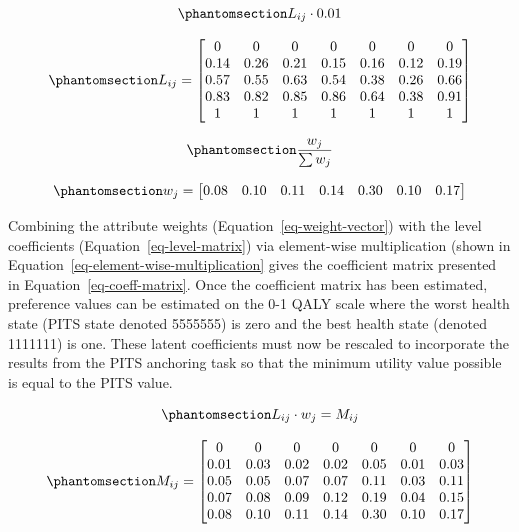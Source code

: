 \documentclass[
  letterpaper,
  DIV=11,
  numbers=noendperiod]{scrartcl}
\begin{document}
\begin{equation}\phantomsection\label{eq-level-rescale}{
    L_{ij} \cdot 0.01
}\end{equation}

\begin{equation}\phantomsection\label{eq-level-matrix}{
L_{ij} = 
\begin{bmatrix}
0 & 0 & 0 & 0 & 0 & 0 & 0 \\
0.14 & 0.26 & 0.21 & 0.15 & 0.16 & 0.12 & 0.19 \\
0.57 & 0.55 & 0.63 & 0.54 & 0.38 & 0.26 & 0.66 \\
0.83 & 0.82 & 0.85 & 0.86 & 0.64 & 0.38 & 0.91 \\
1 & 1 & 1 & 1 & 1 & 1 & 1 \\
\end{bmatrix}
}\end{equation}

\begin{equation}\phantomsection\label{eq-weight-normalise}{
    \frac{w_{j}}{\sum{w_j}}
}\end{equation}

\begin{equation}\phantomsection\label{eq-weight-vector}{
w_j = \begin{bmatrix}
    0.08& 0.10& 0.11& 0.14& 0.30& 0.10& 0.17
\end{bmatrix} 
}\end{equation}

Combining the attribute weights (Equation~\ref{eq-weight-vector}) with
the level coefficients (Equation~\ref{eq-level-matrix}) via element-wise
multiplication (shown in Equation~\ref{eq-element-wise-multiplication}
gives the coefficient matrix presented in
Equation~\ref{eq-coeff-matrix}. Once the coefficient matrix has been
estimated, preference values can be estimated on the 0-1 QALY scale
where the worst health state (PITS state denoted 5555555) is zero and
the best health state (denoted 1111111) is one. These latent
coefficients must now be rescaled to incorporate the results from the
PITS anchoring task so that the minimum utility value possible is equal
to the PITS value.

\begin{equation}\phantomsection\label{eq-element-wise-multiplication}{
    L_{ij} \cdot  w_{j} = {M}_{ij}
}\end{equation}

\begin{equation}\phantomsection\label{eq-coeff-matrix}{
M_{ij} =  
\begin{bmatrix}
0 & 0 & 0 & 0 & 0 & 0 & 0 \\
0.01 & 0.03 & 0.02 & 0.02 & 0.05 & 0.01 & 0.03 \\
0.05 & 0.05 & 0.07 & 0.07 & 0.11 & 0.03 & 0.11 \\
0.07 & 0.08 & 0.09 & 0.12 & 0.19 & 0.04 & 0.15 \\
0.08 & 0.10 & 0.11 & 0.14 & 0.30 & 0.10 & 0.17
\end{bmatrix}
}\end{equation}
\end{document}
